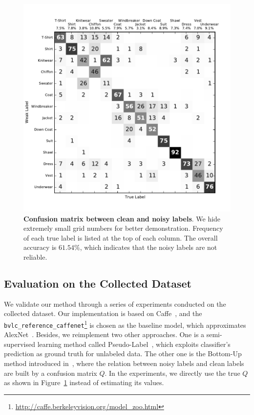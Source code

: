 \documentclass[10pt,twocolumn,letterpaper]{article}
\begin{document}
\begin{figure}[t]
\begin{center}
\includegraphics[width=1.0\linewidth]{figure/cm_strong_weak_labels.pdf}
\end{center}
\caption{\textbf{Confusion matrix between clean and noisy labels}. We hide extremely small grid numbers for better demonstration. Frequency of each true label is listed at the top of each column. The overall accuracy is $61.54\%$, which indicates that the noisy labels are not reliable.}
\label{fig:cm_strong_weak}
\end{figure}

\subsection{Evaluation on the Collected Dataset} %
\label{sub:evaluation}
We validate our method through a series of experiments conducted on the collected dataset. Our implementation is based on Caffe~\cite{jia2014caffe}, and the \texttt{bvlc\_reference\_caffenet}\footnote{\url{http://caffe.berkeleyvision.org/model_zoo.html}} is chosen as the baseline model, which approximates AlexNet~\cite{krizhevsky2012imagenet}. Besides, we reimplement two other approaches. One is a semi-supervised learning method called Pseudo-Label~\cite{lee2013pseudo}, which exploits classifier's prediction as ground truth for unlabeled data. The other one is the Bottom-Up method introduced in~\cite{sukhbaatar2014learning}, where the relation between noisy labels and clean labels are built by a confusion matrix $Q$. In the experiments, we directly use the true $Q$ as shown in Figure~\ref{fig:cm_strong_weak} instead of estimating its values.
\end{document}
